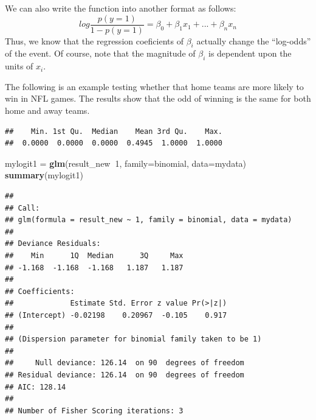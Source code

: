 \documentclass[]{book}
\newenvironment{Shaded}{\begin{snugshade}}{\end{snugshade}}
\newcommand{\KeywordTok}[1]{\textcolor[rgb]{0.13,0.29,0.53}{\textbf{#1}}}
\newcommand{\DataTypeTok}[1]{\textcolor[rgb]{0.13,0.29,0.53}{#1}}
\newcommand{\DecValTok}[1]{\textcolor[rgb]{0.00,0.00,0.81}{#1}}
\newcommand{\StringTok}[1]{\textcolor[rgb]{0.31,0.60,0.02}{#1}}
\newcommand{\OperatorTok}[1]{\textcolor[rgb]{0.81,0.36,0.00}{\textbf{#1}}}
\newcommand{\NormalTok}[1]{#1}
\begin{document}
We can also write the function into another format as follows:
\[log \frac{p(y=1)}{1-p(y=1)}= \beta_0+\beta_1x_1+...+\beta_nx_n\] Thus,
we know that the regression coeficients of \(\beta_i\) actually change
the ``log-odds'' of the event. Of course, note that the magnitude of
\(\beta_i\) is dependent upon the units of \(x_i\).

The following is an example testing whether that home teams are more
likely to win in NFL games. The results show that the odd of winning is
the same for both home and away teams.

\begin{Shaded}
\end{Shaded}

\begin{verbatim}
##    Min. 1st Qu.  Median    Mean 3rd Qu.    Max. 
##  0.0000  0.0000  0.0000  0.4945  1.0000  1.0000
\end{verbatim}

\begin{Shaded}
\begin{Highlighting}[]
\NormalTok{mylogit1 =}\StringTok{ }\KeywordTok{glm}\NormalTok{(result_new}\OperatorTok{~}\DecValTok{1}\NormalTok{, }\DataTypeTok{family=}\NormalTok{binomial, }\DataTypeTok{data=}\NormalTok{mydata)}
\KeywordTok{summary}\NormalTok{(mylogit1)}
\end{Highlighting}
\end{Shaded}

\begin{verbatim}
## 
## Call:
## glm(formula = result_new ~ 1, family = binomial, data = mydata)
## 
## Deviance Residuals: 
##    Min      1Q  Median      3Q     Max  
## -1.168  -1.168  -1.168   1.187   1.187  
## 
## Coefficients:
##             Estimate Std. Error z value Pr(>|z|)
## (Intercept) -0.02198    0.20967  -0.105    0.917
## 
## (Dispersion parameter for binomial family taken to be 1)
## 
##     Null deviance: 126.14  on 90  degrees of freedom
## Residual deviance: 126.14  on 90  degrees of freedom
## AIC: 128.14
## 
## Number of Fisher Scoring iterations: 3
\end{verbatim}
\end{document}
